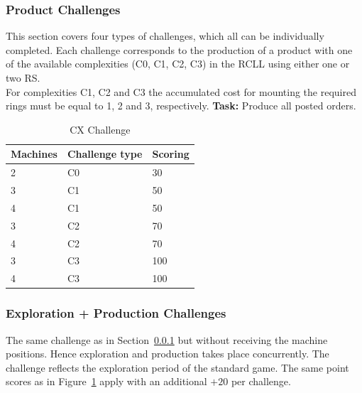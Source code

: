\documentclass[12pt,twoside]{article}
\newcommand{\refsec}[1]{Section~\ref{#1}}
\newcommand{\reffig}[1]{Figure~\ref{#1}}
\begin{document}
\subsubsection{Product Challenges}\label{sec:challenge-cx}
This section covers four types of challenges, which all can be individually
completed.
Each challenge corresponds to the production of a product with one of the
available complexities (C0, C1, C2, C3) in the \ac{RCLL} using either
one or two \ac{RS}.\\
For complexities C1, C2 and C3 the accumulated cost for mounting the required
rings must be equal to 1, 2 and 3, respectively.
\textbf{Task:} Produce all posted orders.\\
\begin{table}[!htb]
 \centering
 \begin{tabular}{l|l|l}
  Machines & Challenge type & Scoring \\\hline
  2 & C0 & 30 \\
  3 & C1 & 50 \\
  4 & C1 & 50 \\
  3 & C2 & 70 \\
  4 & C2 & 70 \\
  3 & C3 & 100 \\
  4 & C3 & 100 \\
 \end{tabular}
 \caption{CX Challenge}
 \label{tab:challenge-cx}
\end{table}

\subsubsection{Exploration + Production Challenges}\label{sec:challenge-combine-exp-c0} %
The same challenge as in \refsec{sec:challenge-cx} but without receiving the
machine positions. Hence exploration and production takes place concurrently.
The challenge reflects the exploration period of the standard game.
The same point scores as in \reffig{tab:challenge-cx} apply with an additional
$+20$ per challenge.
\end{document}
